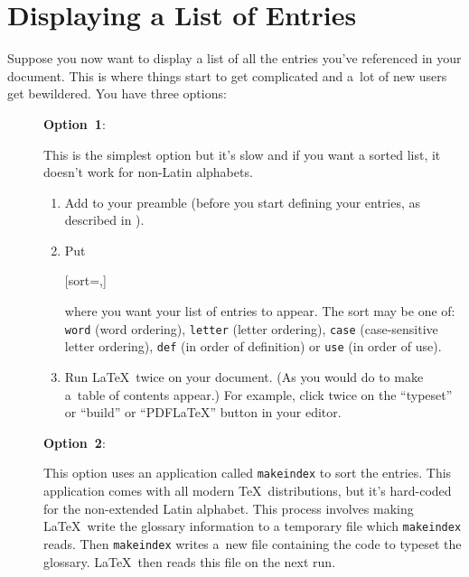 \documentclass{nlctdoc}
\makeatletter
\newcommand*{\optionlabel}[1]{%
 \@glstarget{option#1}{}\textbf{Option~#1}}
\makeatother
\begin{document}
\section{Displaying a List of Entries}
\label{sec:printglossaries}

Suppose you now want to display a list of all the entries you've
referenced in your document. This is where things start to get
complicated and a~lot of new users get bewildered. You have three
options:

\begin{description}
\item[]\optionlabel1: 

 This is the simplest option but it's slow and if
 you want a sorted list, it doesn't work for non-Latin alphabets.

  \begin{enumerate}
    \item Add  to your preamble (before you
    start defining your entries, as described in
    ).

    \item Put
\begin{definition}
[sort=,]
\end{definition}
    where you want your list of entries to appear. The sort
     may be one of: \texttt{word} (word ordering),
    \texttt{letter} (letter ordering), \texttt{case} (case-sensitive
    letter ordering), \texttt{def} (in order of definition) or
    \texttt{use} (in order of use).

    \item Run \LaTeX\ twice on your document. (As you would do to
    make a~table of contents appear.) For example, click twice on
    the ``typeset'' or ``build'' or ``PDF\LaTeX'' button in your editor.
  \end{enumerate}

\item[]\optionlabel2:

   This option uses an application called \texttt{makeindex} to sort 
   the entries. This application comes with all modern \TeX\ distributions, 
   but it's hard-coded for the non-extended Latin alphabet. This process 
   involves making \LaTeX\ write the glossary information to a temporary 
   file which \texttt{makeindex} reads. Then \texttt{makeindex} writes 
   a~new file containing the code to typeset the glossary. \LaTeX\ then 
   reads this file on the next run.


\end{description}
\end{document}
